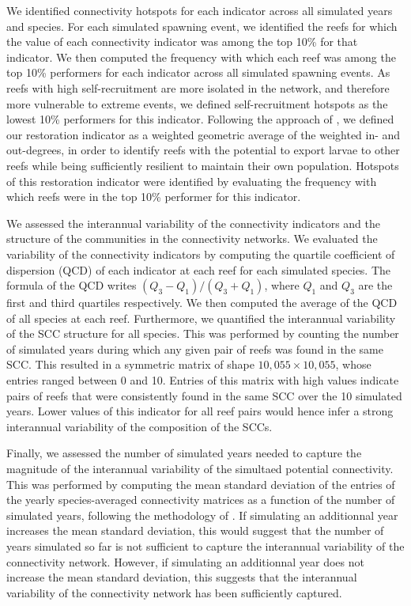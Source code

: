 \documentclass[preprint,12pt,authoryear]{elsarticle}
\begin{document}
	We identified connectivity hotspots for each indicator across all simulated years and species. For each simulated spawning event, we identified the reefs for which the value of each connectivity indicator was among the top 10\% for that indicator. We then computed the frequency with which each reef was among the top 10\% performers for each indicator across all simulated spawning events. As reefs with high self-recruitment are more isolated in the network, and therefore more vulnerable to extreme events, we defined self-recruitment hotspots as the lowest 10\% performers for this indicator. Following the approach of \cite{tnc2024}, we defined our restoration indicator as a weighted geometric average of the weighted in- and out-degrees, in order to identify reefs with the potential to export larvae to other reefs while being sufficiently resilient to maintain their own population. Hotspots of this restoration indicator were identified by evaluating the frequency with which reefs were in the top 10\% performer for this indicator.
	
	We assessed the interannual variability of the connectivity indicators and the structure of the communities in the connectivity networks. We evaluated the variability of the connectivity indicators by computing the quartile coefficient of dispersion (QCD) of each indicator at each reef for each simulated species. The formula of the QCD writes $(Q_3-Q_1) / (Q_3+Q_1)$, where $Q_1$ and $Q_3$ are the first and third quartiles respectively. We then computed the average of the QCD of all species at each reef. Furthermore, we quantified the interannual variability of the SCC structure for all species. This was performed by counting the number of simulated years during which any given pair of reefs was found in the same SCC. This resulted in a symmetric matrix of shape $10,055 \times 10,055$, whose entries ranged between 0 and 10. Entries of this matrix with high values indicate pairs of reefs that were consistently found in the same SCC over the 10 simulated years. Lower values of this indicator for all reef pairs would hence infer a strong interannual variability of the composition of the SCCs.
	
	Finally, we assessed the number of simulated years needed to capture the magnitude of the interannual variability of the simultaed potential connectivity. This was performed by computing the mean standard deviation of the entries of the yearly species-averaged connectivity matrices as a function of the number of simulated years, following the methodology of \cite{thompson2018variability}. If simulating an additionnal year increases the mean standard deviation, this would suggest that the number of years simulated so far is not sufficient to capture the interannual variability of the connectivity network. However, if simulating an additionnal year does not increase the mean standard deviation, this suggests that the interannual variability of the connectivity network has been sufficiently captured.
	
\end{document}
